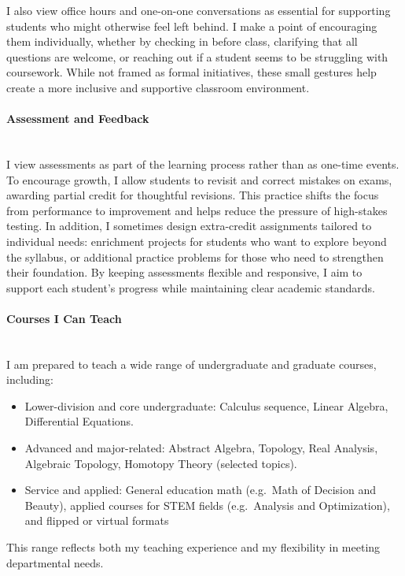 \documentclass[11pt]{article}
\begin{document}
I also view office hours and one-on-one conversations as essential for supporting students who might otherwise feel left behind. 
I make a point of encouraging them individually, whether by checking in before class, clarifying that all questions are welcome, or reaching out if a student seems to be struggling with coursework.
While not framed as formal initiatives, these small gestures help create a more inclusive and supportive classroom environment.


\paragraph{Assessment and Feedback}\quad \\
I view assessments as part of the learning process rather than as one-time events. To encourage growth, I allow students to revisit and correct mistakes on exams, awarding partial credit for thoughtful revisions. This practice shifts the focus from performance to improvement and helps reduce the pressure of high-stakes testing. In addition, I sometimes design extra-credit assignments tailored to individual needs: enrichment projects for students who want to explore beyond the syllabus, or additional practice problems for those who need to strengthen their foundation. By keeping assessments flexible and responsive, I aim to support each student’s progress while maintaining clear academic standards.


\paragraph{Courses I Can Teach}\quad \\
I am prepared to teach a wide range of undergraduate and graduate courses, including:
\begin{itemize}
 \item Lower-division and core undergraduate: Calculus sequence, Linear Algebra, Differential Equations.
 \item Advanced and major-related: Abstract Algebra, Topology, Real Analysis, Algebraic Topology, Homotopy Theory (selected topics).
  \item Service and applied: General education math (e.g.\ Math of Decision and Beauty), applied courses for STEM fields (e.g.\ Analysis and Optimization), and flipped or virtual formats
\end{itemize}
This range reflects both my teaching experience and my flexibility in meeting departmental needs.
\end{document}
